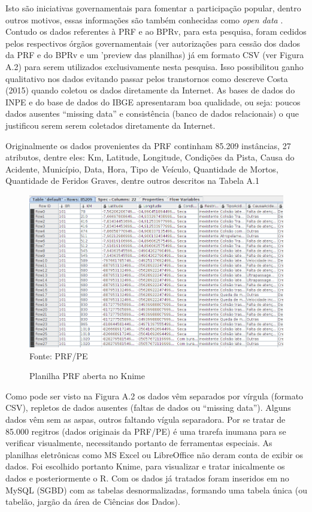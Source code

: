Isto são iniciativas governamentais para fomentar a participação popular, dentro outros motivos, essas informações são também 
conhecidas como \textit{open data} \cite{DadosGoverno}. 
Contudo os dados referentes à PRF e ao BPRv, para esta pesquisa, foram cedidos pelos respectivos 
órgãos governamentais (ver autorizações para cessão dos dados da PRF e do BPRv e um 'preview das planilhas) já em formato CSV (ver Figura A.2) para serem utilizados exclusivamente nesta pesquisa. 
Isso possibilitou ganho qualitativo nos dados evitando 
passar pelos transtornos como descreve Costa (2015) quando coletou os dados diretamente da Internet.\cite{Costa2015} 
As bases de dados do INPE e do base de dados do IBGE apresentaram boa qualidade, ou seja: poucos dados ausentes ``missing data'' e consistência (banco de dados relacionais) o que justificou serem serem coletados diretamente da Internet.

Originalmente os dados provenientes da PRF continham 85.209 instâncias, 27 atributos, dentre eles: Km, Latitude, Longitude, Condições da Pista, Causa do Acidente, Município, Data, Hora, Tipo de Veículo, Quantidade de Mortos, Quantidade de Feridos Graves, dentre outros descritos na Tabela A.1


\begin{figure}[ht!]
\centering
\caption{Planilha PRF aberta no Knime}
\includegraphics[width=0.9\linewidth]{Figuras/Anexos/PlanilhaPRF.png}
\label{fig:PreviaPlanilhaPRF}\\
\tiny Fonte: PRF/PE
\end{figure}

Como pode ser visto na Figura A.2 os dados vêm separados por vírgula (formato CSV), repletos de dados ausentes (faltas de dados ou ``missing data''). Alguns dados vêm sem as aspas, outros faltando vígula separadora. Por se tratar de 85.000 regitros (dados originais da PRF/PE) é uma trarefa inumana para se verificar visualmente, necessitando portanto de ferramentas especiais. As planilhas eletrônicas como MS Excel ou LibreOffice não deram conta de exibir os dados. Foi escolhido portanto Knime, para visualizar e tratar inicalmente os dados e posteriormente o R. Com os dados já tratados foram inseridos em no MySQL (SGBD) com as tabelas desnormalizadas, formando uma tabela única (ou tabelão, jargão da área de Ciências dos Dados).

